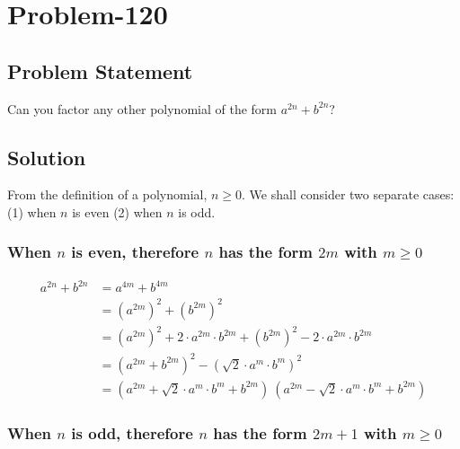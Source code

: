 \documentclass[12pt]{article}
\begin{document}
\section*{Problem-120}
\subsection*{Problem Statement}
Can you factor any other polynomial of the form $a^{2n} + b^{2n}$?

\subsection*{Solution}
From the definition of a polynomial, $n \geq 0$. We shall consider two separate cases: (1) when $n$ is even (2) when $n$ is odd.

\subsubsection*{When $n$ is even, therefore $n$ has the form $2m$ with $m \geq 0$}

\begin{equation*}
	\begin{aligned}
		a^{2n}+b^{2n} &= a^{4m}+b^{4m}\\
					  &= \left( a^{2m} \right)^2 + \left( b^{2m} \right)^2\\
					  &= \left( a^{2m} \right)^2 + 2\cdot a^{2m}\cdot b^{2m}+ \left( b^{2m} \right)^2 - 2\cdot a^{2m}\cdot b^{2m}\\
					  &= \left( a^{2m}+b^{2m} \right)^2 - \left( \sqrt{2} \cdot a^m \cdot b^m \right)^2\\
					  &= \left( a^{2m}+ \sqrt{2} \cdot a^m \cdot b^m + b^{2m} \right)\ \left( a^{2m} - \sqrt{2} \cdot a^m \cdot b^m + b^{2m} \right)
	\end{aligned}
\end{equation*}

\subsubsection*{When $n$ is odd, therefore $n$ has the form $2m+1$ with $m \geq 0$}
\end{document}
